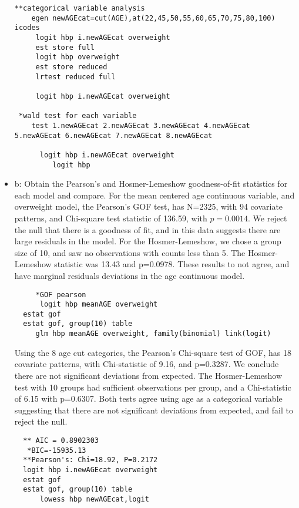 \documentclass{article}
\begin{document}
\begin{itemize}
        \begin{verbatim}
**categorical variable analysis
	egen newAGEcat=cut(AGE),at(22,45,50,55,60,65,70,75,80,100) icodes
  	 logit hbp i.newAGEcat overweight
	 est store full
	 logit hbp overweight
	 est store reduced
	 lrtest reduced full
		 
	 logit hbp i.newAGEcat overweight
	 
 *wald test for each variable
	test 1.newAGEcat 2.newAGEcat 3.newAGEcat 4.newAGEcat 5.newAGEcat 6.newAGEcat 7.newAGEcat 8.newAGEcat     
	
	  logit hbp i.newAGEcat overweight
		 logit hbp 
		\end{verbatim}
        
    \item b: Obtain the Pearson’s and Hosmer-Lemeshow goodness-of-fit statistics for each model and compare.
      For the mean centered age continuous variable, and overweight model, the Pearson's GOF test, has N=2325, with 94 covariate patterns, and Chi-square test statistic of 136.59, with $p=0.0014$.  We reject the null that there is a goodness of fit, and in this data suggests there are large residuals in the model.  For the Hosmer-Lemeshow, we chose a group size of 10, and saw no observations with counts less than 5.  The Hosmer-Lemeshow statistic was 13.43 and p=0.0978. These results to not agree, and have marginal residuals deviations in the age continuous model.
     \begin{verbatim}
     *GOF pearson
      logit hbp meanAGE overweight
  estat gof
  estat gof, group(10) table 
     glm hbp meanAGE overweight, family(binomial) link(logit)
     \end{verbatim}
    
    
     Using the 8 age cut categories, the Pearson's Chi-square test of GOF, has 18 covariate patterns, with Chi-statistic of 9.16, and p=0.3287. We conclude there are not significant deviations from expected.  The Hosmer-Lemeshow test with 10 groups had sufficient observations per group, and a Chi-statistic of 6.15 with p=0.6307.  Both tests agree using age as a categorical variable suggesting that there are not significant deviations from expected, and fail to reject the null.
    
     \begin{verbatim}
  ** AIC = 0.8902303
   *BIC=-15935.13
  **Pearson's: Chi=18.92, P=0.2172
  logit hbp i.newAGEcat overweight
  estat gof
  estat gof, group(10) table 
      lowess hbp newAGEcat,logit
      \end{verbatim}
    

\end{itemize}
\end{document}
